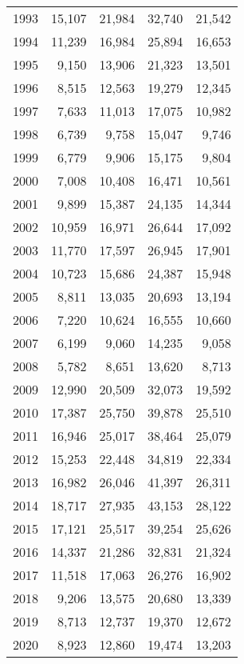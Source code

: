 \documentclass[11pt]{book}
\begin{document}
\begin{longtable}[]{@{}lrrrr@{}}
1993 & 15,107 & 21,984 & 32,740 & 21,542\tabularnewline
1994 & 11,239 & 16,984 & 25,894 & 16,653\tabularnewline
1995 & 9,150 & 13,906 & 21,323 & 13,501\tabularnewline
1996 & 8,515 & 12,563 & 19,279 & 12,345\tabularnewline
1997 & 7,633 & 11,013 & 17,075 & 10,982\tabularnewline
1998 & 6,739 & 9,758 & 15,047 & 9,746\tabularnewline
1999 & 6,779 & 9,906 & 15,175 & 9,804\tabularnewline
2000 & 7,008 & 10,408 & 16,471 & 10,561\tabularnewline
2001 & 9,899 & 15,387 & 24,135 & 14,344\tabularnewline
2002 & 10,959 & 16,971 & 26,644 & 17,092\tabularnewline
2003 & 11,770 & 17,597 & 26,945 & 17,901\tabularnewline
2004 & 10,723 & 15,686 & 24,387 & 15,948\tabularnewline
2005 & 8,811 & 13,035 & 20,693 & 13,194\tabularnewline
2006 & 7,220 & 10,624 & 16,555 & 10,660\tabularnewline
2007 & 6,199 & 9,060 & 14,235 & 9,058\tabularnewline
2008 & 5,782 & 8,651 & 13,620 & 8,713\tabularnewline
2009 & 12,990 & 20,509 & 32,073 & 19,592\tabularnewline
2010 & 17,387 & 25,750 & 39,878 & 25,510\tabularnewline
2011 & 16,946 & 25,017 & 38,464 & 25,079\tabularnewline
2012 & 15,253 & 22,448 & 34,819 & 22,334\tabularnewline
2013 & 16,982 & 26,046 & 41,397 & 26,311\tabularnewline
2014 & 18,717 & 27,935 & 43,153 & 28,122\tabularnewline
2015 & 17,121 & 25,517 & 39,254 & 25,626\tabularnewline
2016 & 14,337 & 21,286 & 32,831 & 21,324\tabularnewline
2017 & 11,518 & 17,063 & 26,276 & 16,902\tabularnewline
2018 & 9,206 & 13,575 & 20,680 & 13,339\tabularnewline
2019 & 8,713 & 12,737 & 19,370 & 12,672\tabularnewline
2020 & 8,923 & 12,860 & 19,474 & 13,203\tabularnewline
\bottomrule
\end{longtable}
\end{document}
